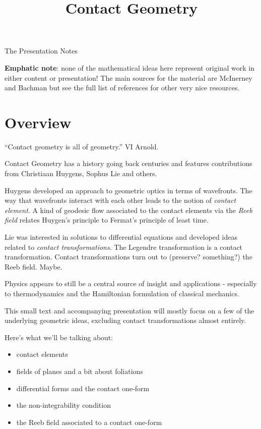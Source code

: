 \documentclass{article}
\begin{document}
\title {Contact Geometry}
\maketitle

\centerline{\sc \large The Presentation Notes}
\onehalfspace

\tableofcontents

\newpage

\textbf{Emphatic note}: none of the mathematical ideas here represent original work in
either content or presentation! The main sources for the material are McInerney
\cite{mcinerney} and Bachman \cite{bachman} but see the full list of references for other very nice resources.

\newpage

\section {Overview}

``Contact geometry is all of geometry.'' VI Arnold.

Contact Geometry has a history going back centuries and features contributions
from Christiaan Huygens, Sophus Lie and others.

Huygens developed an approach to geometric optics in terms of wavefronts. The way that
wavefronts interact with each other leads to the notion of \textit{contact
  element}. A kind of geodesic flow associated to the contact elements via the
\textit{Reeb field} relates Huygen's principle to Fermat's principle of least time.

Lie was interested in solutions to differential equations and developed ideas
related to \textit{contact transformations}. The Legendre transformation is a
contact transformation. Contact transformations turn out to (preserve?
something?) the Reeb field. Maybe.

Physics appears to still be a central source of insight and applications -
especially to thermodynamics and the Hamiltonian formulation of classical mechanics.

This small text and accompanying presentation will mostly focus on a few of the
underlying geometric ideas, excluding contact transformations almost entirely.

Here's what we'll be talking about:

\begin{itemize}
\item contact elements
\item fields of planes and a bit about foliations
\item differential forms and the contact one-form
\item the non-integrability condition
\item the Reeb field associated to a contact one-form
\end {itemize}
\end{document}
